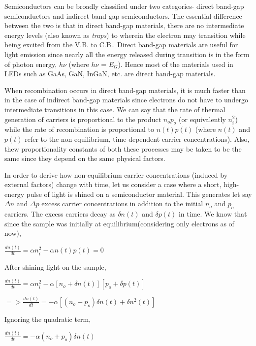 \documentclass[12 pt]{article}
\begin{document}
Semiconductors can be broadly classified under two categories- direct band-gap semiconductors and indirect band-gap semiconductors. The essential difference between the two is that in direct band-gap materials, there are no intermediate energy levels (also known as \emph{traps}) to wherein the electron may transition while being excited from the V.B. to C.B.. Direct band-gap materials are useful for light emission since nearly all the energy released during transition is in the form of photon energy, $h\nu$ (where $h\nu$ = $E_{G}$). Hence most of the materials used in LEDs such as GaAs, GaN, InGaN, etc. are direct band-gap materials. \par

When recombination occurs in direct band-gap materials, it is much faster than in the case of indirect band-gap materials since electrons do not have to undergo intermediate transitions in this case. We can say that the rate of thermal generation of carriers is proportional to the product $n_{o}p_{o}$ (or equivalently $n_{i}^{2}$) while the rate of recombination is proportional to $n(t)p(t)$ (where $n(t)$ and $p(t)$ refer to the non-equilibrium, time-dependent carrier concentrations). Also, thew proportionality constants of both these processes may be taken to be the same since they depend on the same physical factors. \par

In order to derive how non-equilibrium carrier concentrations (induced by external factors) change with time, let us consider a case where a short, high-energy pulse of light is shined on a semiconductor material. This generates let say $\Delta n$ and $\Delta p$ excess carrier concentrations in addition to the initial $n_{o}$ and $p_{o}$ carriers. The excess carriers decay as $\delta n(t)$ and $\delta p(t)$ in time. We know that since the sample was initially at equilibrium(considering only electrons as of now),
\begin{center}
    $ \frac{dn(t)}{dt} = \alpha n_{i}^2 - \alpha n(t)p(t) = 0$
\end{center}
After shining light on the sample,
\begin{center}
    $  \frac{dn(t)}{dt} = \alpha n_{i}^{2} - \alpha [n_{o}+\delta n(t)][p_{o}+\delta p(t)] $
\end{center}

\begin{center}
    $ => \frac{dn(t)}{dt} = -\alpha [(n_{o}+p_{o})\delta n(t) + \delta n^{2}(t)]  $
\end{center}
Ignoring the quadratic term,
\begin{center}
    $ \frac{dn(t)}{dt} = -\alpha (n_{o}+p_{o})\delta n(t) $
\end{center}
\end{document}

